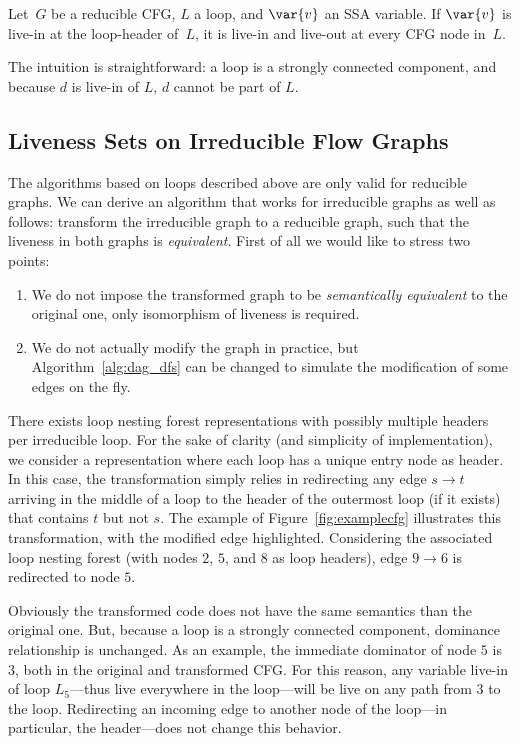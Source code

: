 \begin{lemma}
	\label{lemma:secondpass}
	Let~$G$ be a reducible CFG, $L$ a loop, and $\var{v}$ an SSA variable.
	If $\var{v}$ is live-in at the loop-header of~$L$, it is live-in and live-out at every CFG node in~$L$.
\end{lemma}

The intuition is straightforward: a loop is a strongly connected component, and because $d$ is live-in of $L$, $d$ cannot be part of $L$. 


 \subsection{Liveness Sets on Irreducible Flow Graphs}
\label{sec:irreducible}

The algorithms based on loops described above are only valid for reducible 
graphs.
We can derive an algorithm that works for irreducible graphs as well as 
follows:
transform the irreducible graph to a reducible 
graph, such that the liveness in both graphs is 
\emph{equivalent}.
First of all we would like to stress two points:
\begin{enumerate}
\item We do not impose the transformed graph to be \emph{semantically 
equivalent} to the original one, only isomorphism of liveness is required.  
\item We do not actually modify the graph in practice, but 
  Algorithm~\ref{alg:dag_dfs} can be changed to simulate the modification of 
  some edges on the fly.
\end{enumerate}

There exists loop nesting forest representations with possibly multiple headers 
per irreducible loop.
For the sake of clarity (and simplicity of implementation), we consider a representation where each loop has a unique entry node as header.
In this case, the transformation simply relies in redirecting any edge $s\rightarrow t$ arriving in the middle of a loop to the header of the outermost loop (if it exists) that contains $t$ but not $s$.
The example of Figure~\ref{fig:examplecfg} illustrates this transformation, with the modified edge highlighted.
Considering the associated loop nesting forest (with nodes $2$, $5$, and $8$ as loop headers), edge $9\rightarrow 6$ is redirected to node $5$.

Obviously the transformed code does not have the same semantics than the original one.
But, because a loop is a strongly connected component, dominance relationship is unchanged.
As an example, the immediate dominator of node $5$ is $3$, both in the original and transformed CFG.
For this reason, any variable live-in of loop $L_5$---thus live everywhere in the loop---will be live on any path from $3$ to the loop.
Redirecting an incoming edge to another node of the loop---in particular, the header---does not change this behavior.

